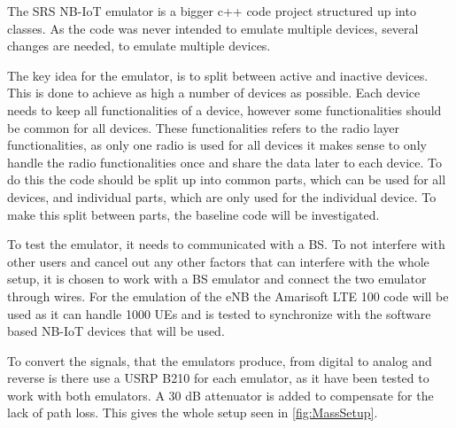 The SRS NB-IoT emulator is a bigger c++ code project structured up into classes. As the code was never intended to emulate multiple devices, several changes are needed, to emulate multiple devices.



The key idea for the emulator, is to split between active and inactive devices. This is done to achieve as high a number of devices as possible. Each device needs to keep all functionalities of a device, however some functionalities should be common for all devices. These functionalities refers to the radio layer functionalities, as only one radio is used for all devices it makes sense to only handle the radio functionalities once and share the data later to each device. To do this the code should be split up into common parts, which can be used for all devices, and individual parts, which are only used for the individual device. To make this split between parts, the baseline code will be investigated.

To test the emulator, it needs to communicated with a BS. To not interfere with other users and cancel out any other factors that can interfere with the whole setup, it is chosen to work with a BS emulator and connect the two emulator through wires. For the emulation of the eNB the Amarisoft LTE 100 code will be used as it can handle 1000 \gls{UE}s \citep{Amarisoft_solutions} and is tested to synchronize with the software based NB-IoT devices that will be used. 

To convert the signals, that the emulators produce, from digital to analog and reverse is there use a USRP B210 for each emulator, as it have been tested to work with both emulators. A 30 dB attenuator is added to compensate for the lack of path loss. This gives the whole setup seen in \autoref{fig:MassSetup}. 






